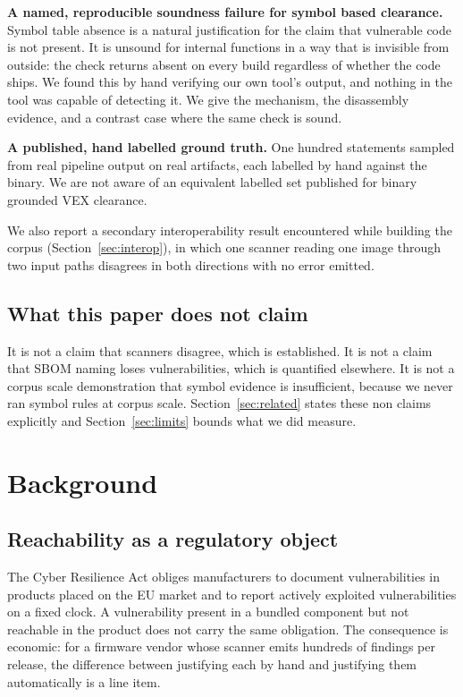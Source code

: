 \textbf{A named, reproducible soundness failure for symbol based clearance.}
Symbol table absence is a natural
justification for the claim that vulnerable code is not present. It is unsound
for internal functions in a way that is invisible from outside: the check returns absent on every build
regardless of whether the code ships. We found this by hand verifying our own
tool's output, and nothing in the tool was capable of detecting it. We give the
mechanism, the disassembly evidence, and a contrast case where the same check is
sound.

\textbf{A published, hand labelled ground truth.} One hundred statements sampled
from real pipeline output on real artifacts, each labelled by hand against the
binary. We are not aware of an equivalent labelled set published for binary
grounded VEX clearance.

We also report a secondary interoperability result encountered while building the
corpus (Section~\ref{sec:interop}), in which one scanner reading one image
through two input paths disagrees in both directions with no error emitted.

\subsection{What this paper does not claim}

It is not a claim that scanners disagree, which is established. It is not a claim
that SBOM naming loses vulnerabilities, which is quantified elsewhere. It is not
a corpus scale demonstration that symbol evidence is insufficient, because we
never ran symbol rules at corpus scale. Section~\ref{sec:related} states these
non claims explicitly and Section~\ref{sec:limits} bounds what we did measure.

\section{Background}

\subsection{Reachability as a regulatory object}

The Cyber Resilience Act obliges manufacturers to document vulnerabilities in
products placed on the EU market and to report actively exploited vulnerabilities
on a fixed clock. A vulnerability present in a bundled component but not
reachable in the product does not carry the same obligation. The consequence is
economic: for a firmware vendor whose scanner emits hundreds of findings per
release, the difference between justifying each by hand and justifying them
automatically is a line item.

